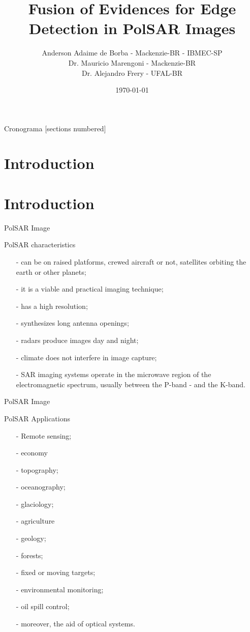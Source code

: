 \documentclass[10pt]{beamer}
\title{Fusion of Evidences for Edge Detection in PolSAR Images}
\date{\today}
\author{Anderson Adaime de Borba - Mackenzie-BR - IBMEC-SP\\
        Dr. Mauricio Marengoni - Mackenzie-BR\\
        Dr. Alejandro Frery - UFAL-BR}
\institute{TENGRSS - 2019}
\begin{document}
\maketitle

\begin{frame}{Cronograma}
  [sections numbered]
  \tableofcontents[hideallsubsections]
\end{frame}

\section{Introduction}

\section{Introduction}

\begin{frame}[fragile]{PolSAR Image}
\begin{alertblock}{PolSAR characteristics}
\begin{itemize}
\item[-] can be on raised platforms, crewed aircraft or not, satellites orbiting the  earth or other planets;
\item[-] it is a viable and practical imaging technique;
\item[-] has a high resolution;
\item[-] synthesizes long antenna openings;
\item[-] radars produce images day and night;
\item[-] climate does not interfere in image capture;
\item[-] SAR imaging systems operate in the microwave region of the electromagnetic spectrum, usually between the P-band - and the K-band.
\end{itemize}
\end{alertblock}
\end{frame}

\begin{frame}[fragile]{PolSAR Image}
\begin{alertblock}{PolSAR Applications}
\begin{itemize}
\item[-] Remote sensing;
\item[-] economy
\item[-] topography;
\item[-] oceanography;
\item[-] glaciology;
\item[-] agriculture
\item[-] geology;
\item[-] forests;
\item[-] fixed or moving targets;
\item[-] environmental monitoring;
\item[-] oil spill control;
\item[-] moreover, the aid of optical systems.
\end{itemize}
\end{alertblock}
\end{frame}
\end{document}
